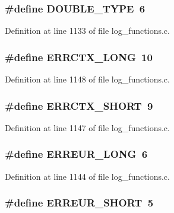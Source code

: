 \subsubsection[{DOUBLE\_\-TYPE}]{\setlength{\rightskip}{0pt plus 5cm}\#define DOUBLE\_\-TYPE~6}\label{log__functions_8c_77691fa5b017b6f6e932224ffc952fe5}




Definition at line 1133 of file log\_\-functions.c.
\subsubsection[{ERRCTX\_\-LONG}]{\setlength{\rightskip}{0pt plus 5cm}\#define ERRCTX\_\-LONG~10}\label{log__functions_8c_e2d9a44c3fe0f58f0f394d1b3f357b13}




Definition at line 1148 of file log\_\-functions.c.
\subsubsection[{ERRCTX\_\-SHORT}]{\setlength{\rightskip}{0pt plus 5cm}\#define ERRCTX\_\-SHORT~9}\label{log__functions_8c_4098e0167ffc21728f7360375f314b8a}




Definition at line 1147 of file log\_\-functions.c.
\subsubsection[{ERREUR\_\-LONG}]{\setlength{\rightskip}{0pt plus 5cm}\#define ERREUR\_\-LONG~6}\label{log__functions_8c_b74d6bbfcddb14e95a1d84f9149e62d4}




Definition at line 1144 of file log\_\-functions.c.
\subsubsection[{ERREUR\_\-SHORT}]{\setlength{\rightskip}{0pt plus 5cm}\#define ERREUR\_\-SHORT~5}\label{log__functions_8c_6029c78a8cd07da6d8ced1675dad9915}




